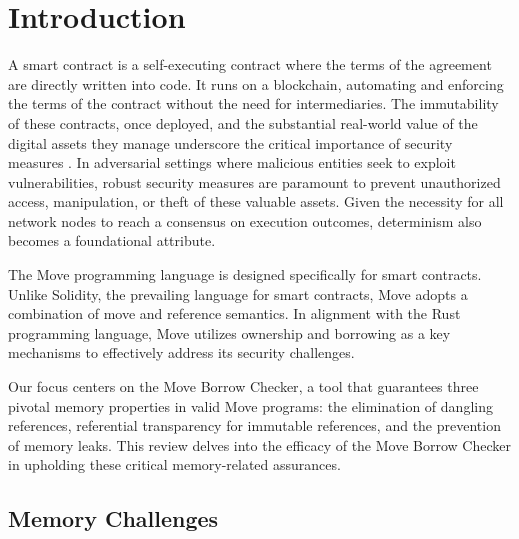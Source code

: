 \section{Introduction}
A smart contract is a self-executing contract where the terms of the agreement are directly written into code. It runs on a blockchain, automating and enforcing the terms of the contract without the need for intermediaries. The immutability of these contracts, once deployed, and the substantial real-world value of the digital assets they manage underscore the critical importance of security measures \cite{cnbc2023}. In adversarial settings where malicious entities seek to exploit vulnerabilities, robust security measures are paramount to prevent unauthorized access, manipulation, or theft of these valuable assets\cite{Atzei2017ASO}. Given the necessity for all network nodes to reach a consensus on execution outcomes, determinism also becomes a foundational attribute.


The Move programming language \cite{Blackshear2019MoveAL} is designed specifically for smart contracts. Unlike Solidity, the prevailing language for smart contracts, Move adopts a combination of move and reference semantics. In alignment with the Rust programming language, Move utilizes ownership and borrowing as a key mechanisms to effectively address its security challenges.


Our focus centers on the Move Borrow Checker\cite{blackshear2022borrow}, a tool that guarantees three pivotal memory properties in valid Move programs: the elimination of dangling references, referential transparency for immutable references, and the prevention of memory leaks. This review delves into the efficacy of the Move Borrow Checker in upholding these critical memory-related assurances.

\subsection{Memory Challenges}

